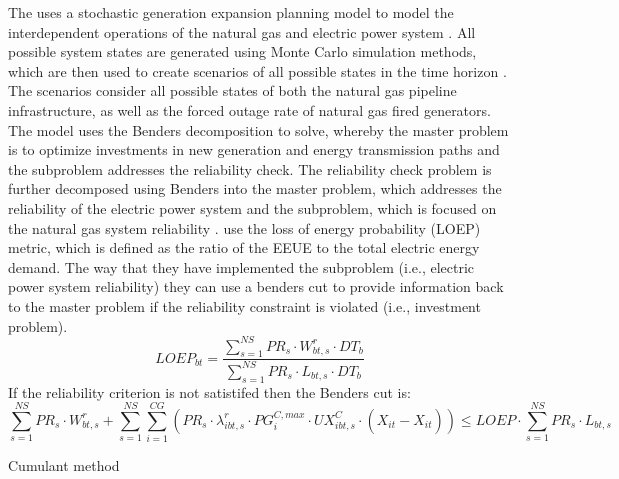 \documentclass[10pt]{amsart}
\begin{document}
The uses a stochastic generation expansion planning model to model the interdependent operations of the natural gas and electric power system \parencite{pantos:2013aa}.
All possible system states are generated using Monte Carlo simulation methods, which are then used to create scenarios of all possible states in the time horizon \parencite{pantos:2013aa}. 
The scenarios consider all possible states of both the natural gas pipeline infrastructure, as well as the forced outage rate of natural gas fired generators. 
The model uses the Benders decomposition to solve, whereby the master problem is to optimize investments in new generation and energy transmission paths and the subproblem addresses the reliability check.
The reliability check problem is further decomposed using Benders into  the master problem, which addresses the reliability of the electric power system and the subproblem, which is focused on the natural gas system reliability \parencite{pantos:2013aa}. 
\cite{pantos:2013aa} use the loss of energy probability (LOEP) metric, which is defined as the ratio of the EEUE to the total electric energy demand. 
The way that they have implemented the subproblem (i.e., electric power system reliability) they can use a benders cut to provide information back to the master problem if the reliability constraint is violated (i.e., investment problem). 
\begin{equation}
LOEP_{bt} = \frac{\sum_{s=1}^{NS} PR_{s}\cdot W^{r}_{bt, s}\cdot DT_{b}}{\sum_{s=1}^{NS} PR_{s}\cdot L_{bt, s}\cdot DT_{b}}
\end{equation}
If the reliability criterion is not satistifed then the Benders cut is:
\begin{equation}
\sum_{s=1}^{NS} PR_{s}\cdot W^{r}_{bt,s} + \sum_{s=1}^{NS}\sum_{i=1}^{CG}(PR_{s}\cdot\lambda^{r}_{ibt,s}\cdot PG^{C,max}_{i}\cdot UX^{C}_{ibt,s}\cdot (X_{it}-\hat{X}_{it}))\leq LOEP\cdot \sum_{s=1}^{NS}PR_{s}\cdot L_{bt,s}
\end{equation}

Cumulant method
\cite{kothari2009optimal, stremel1980production, sirikum2006power}
\end{document}
